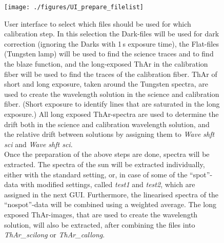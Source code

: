 \documentclass[10pt,a4paper]{article}
\begin{document}
\begin{figure} 
  \begin{center}
    \texttt{[image: ./figures/UI\_prepare\_filelist]}
  \end{center} 
  \caption{User interface to select which files should be used for which calibration step. In this selection the Dark-files will be used for dark correction (ignoring the Darks with 1\,s exposure time), the Flat-files (Tungsten lamp) will be used to find the science traces and to find the blaze function, and the long-exposed ThAr in the calibration fiber will be used to find the traces of the calibration fiber. ThAr of short and long exposure, taken around the Tungsten spectra, are used to create the wavelength solution in the science and calibration fiber. (Short exposure to identify lines that are saturated in the long exposure.) All long exposed ThAr-spectra are used to determine the drift both in the science and calibration wavelength solution, and the relative drift between solutions by assigning them to \textit{Wave shft sci} and \textit{Wave shft sci}. \\
  Once the preparation of the above steps are done, spectra will be extracted. The spectra of the sun will be extracted individually, either with the standard setting, or, in case of some of the ``spot''-data with modified settings, called \textit{test1} and \textit{test2}, which are assigned in the next GUI. Furthermore, the linearised spectra of the ``nospot''-data will be combined using a weighted average. The long exposed ThAr-images, that are used to create the wavelength solution, will also be extracted, after combining the files into \textit{ThAr\_scilong} or \textit{ThAr\_callong}.
    \label{Fig:UI_prepare_filelist}}
\end{figure}
\end{document}

